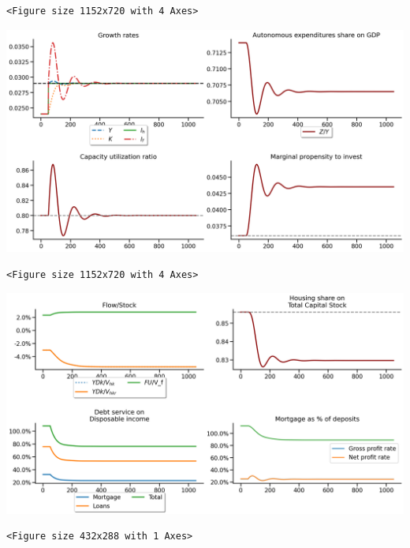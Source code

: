 \documentclass[11pt]{article}
\begin{document}
\begin{verbatim}
<Figure size 1152x720 with 4 Axes>
\end{verbatim}


\begin{center}
\includegraphics[width=.9\linewidth]{obipy-resources/833ba20b4aec1c9746a2e4fcac62a826eabb201d/cf1301f1049a939aebb27aca3ec93a940b6bfe9b.png}
\end{center}

\begin{verbatim}
<Figure size 1152x720 with 4 Axes>
\end{verbatim}


\begin{center}
\includegraphics[width=.9\linewidth]{obipy-resources/833ba20b4aec1c9746a2e4fcac62a826eabb201d/6381ee9168a32a9ba7c12cedc582c3b91b1c8cfd.png}
\end{center}

\begin{verbatim}
<Figure size 432x288 with 1 Axes>
\end{verbatim}
\end{document}
